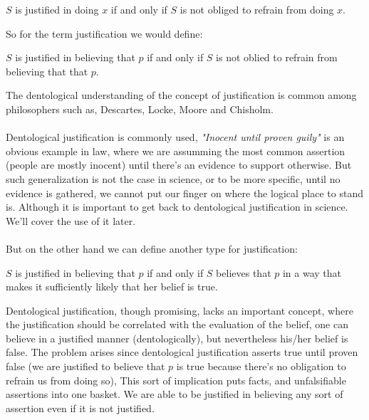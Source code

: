 \documentclass[9pt,a4paper,twocolumn]{article}
\newcounter{def}
\begin{document}
                \begin{define}
                    $S$ is justified in doing $x$ if and only if $S$ is not obliged to refrain from doing $x$.
                \end{define}
                So for the term justification we would define:
                \begin{define}
                    $S$ is justified in believing that $p$ if and only if $S$ is not oblied to refrain from believing that that $p$.
                \end{define}
                The dentological understanding of the concept of justification is common among philosophers such as, Descartes, Locke, Moore and Chisholm.
                \\
                \\
                Dentological justification is commonly used, \textit{"Inocent until proven guily"} is an obvious example in law, where we are assumming the most common assertion (people are mostly inocent) until there's an evidence to support otherwise. But such generalization is not the case in science, or to be more specific, until no evidence is gathered, we cannot put our finger on where the logical place to stand is. Although it is important to get back to dentological justification in science. We'll cover the use of it later.
                \\
                \\
                But on the other hand we can define another type for justification:
                \begin{define}
                    $S$ is justified in believing that $p$ if and only if $S$ believes that $p$ in a way that makes it sufficiently likely that her belief is true.
                \end{define}
                Dentological justification, though promising, lacks an important concept, where the justification should be correlated with the evaluation of the belief, one can believe in a justified manner (dentologically), but nevertheless his/her belief is false. The problem arises since dentological justification asserts true until proven false (we are justified to believe that $p$ is true because there's no obligation to refrain us from doing so), This sort of implication puts facts, and unfalsifiable assertions into one basket. We are able to be justified in believing any sort of assertion even if it is not justified.\cite{sep-epistemology}
                \\
\end{document}
